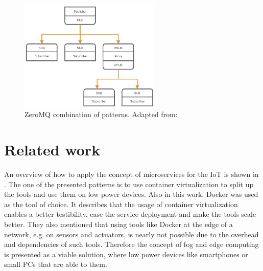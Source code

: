 \begin{figure}[H]
    \centering
    \includegraphics[width=0.6\textwidth]{resources/images/zeromq-complex.png}
    \caption[ZeroMQ combination of patterns]{ZeroMQ combination of patterns. Adapted from: \autocite{ZeroMQ:Guide}}
    \label{fig:zeromq_comination}
\end{figure}


\section{Related work}
\label{section:related_work}
An overview of how to apply the concept of microservices for the \ac{IoT} is shown in \autocite{Butzin:2016}.
The one of the presented patterns is to use container virtualization to split up the tools and use them on low power devices.
Also in this work, Docker was used as the tool of choice.
It describes that the usage of container virtualization enables a better testibility, ease the service deployment and make the tools scale better.\autocite[cf.][p. 5]{Butzin:2016}
They also mentioned that using tools like Docker at the edge of a network, e.g. on sensors and actuators, is nearly not possible due to the overhead and dependencies of such tools.\autocite[cf.][p. 5]{Butzin:2016}
Therefore the concept of fog and edge computing is presented as a viable solution, where low power devices like smartphones or small \acp{PC} that are able to them.\autocite[cf.][p. 5]{Butzin:2016}

